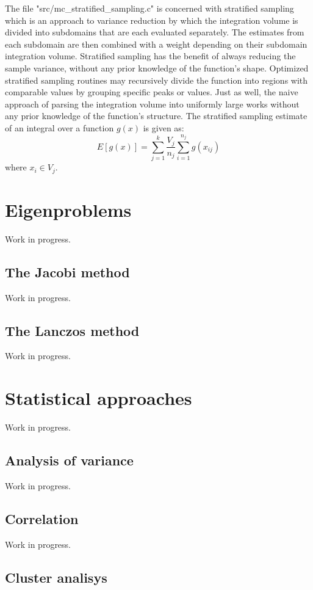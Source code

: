 \documentclass{book}
\begin{document}
The file "src/mc\_stratified\_sampling.c" is concerned with stratified sampling which is an approach to variance reduction
by which the integration volume is divided into subdomains that are each evaluated separately. The estimates from each
subdomain are then combined with a weight depending on their subdomain integration volume. Stratified sampling has the
benefit of always reducing the sample variance, without any prior knowledge of the function’s shape. Optimized stratified
sampling routines may recursively divide the function into regions with comparable values by grouping specific peaks or values.
Just as well, the naive approach of parsing the integration volume into uniformly large works without any prior knowledge of the function’s structure.
The stratified sampling estimate of an integral over a function $g(x)$ is given as:
$$
 E[g(x)] = \sum_{j=1}^k \frac{V_j}{n_j} \sum_{i=1}^{n_j} g(x_{ij})
$$
where $x_i \in V_j$.



\section{Eigenproblems}

Work in progress.
\subsection{The Jacobi method}

Work in progress.
\subsection{The Lanczos method}

Work in progress.

\section{Statistical approaches}

Work in progress.
\subsection{Analysis of variance}

Work in progress.
\subsection{Correlation}

Work in progress.
\subsection{Cluster analisys}
\end{document}
